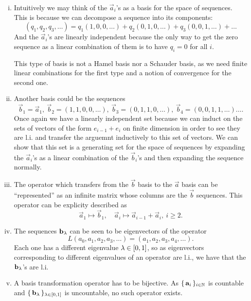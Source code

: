 \documentclass[12pt]{memoir}
\begin{document}
\begin{ptcbr}
    \begin{enumerate}[(i)]
        \item Intuitively we may think of the $\vec a_i$'s as a basis for the space of sequences. This is because we can decompose a sequence into its components:
        $$(q_1,q_2,q_3,\dots)=q_1(1,0,0,\dots)+q_2(0,1,0,\dots)+q_3(0,0,1,\dots)+\dots$$
        And the $\vec a_i$'s are linearly independent because the only way to get the zero sequence as a linear combination of them is to have $q_i=0$ for all $i$.\par 
        This type of basis is not a Hamel basis nor a Schauder basis, as we need finite linear combinations for the first type and a notion of convergence for the second one.
        \item Another basis could be the sequences 
        $$\vec b_1=\vec a_1,\ \vec b_2=(1,1,0,0,\dots),\ \vec b_3=(0,1,1,0,\dots),\ \vec b_4=(0,0,1,1,\dots).\dots$$
        Once again we have a linearly independent set because we can induct on the sets of vectors of the form $e_{i-1}+e_{i}$ on finite dimension in order to see they are l.i. and transfer the arguemnt inductively to this set of vectors. We can show that this set is a generating set for the space of sequences by expanding the $\vec a_i$'s as a linear combination of the $\vec b_i$'s and then expanding the sequence normally. 
        \item The operator which transfers from the $\vec b$ basis to the $\vec a$ basis can be ``represented'' as an infinite matrix whose columns are the $\vec b$ sequences. This operator can be explicity described as 
        $$\vec a_1\mapsto\vec b_1,\quad \vec a_i\mapsto\vec a_{i-1}+\vec a_{i},\ i\geq 2.$$
        \item The sequences $\mathbf{b}_\lambda$ can be seen to be eigenvectors of the operator 
        $$L(a_0,a_1,a_2,a_3,\dots)=(a_1,a_2,a_3,a_4,\dots).$$
        Each one has a different eigenvalue $\lambda\in\left\lbrack0,1\right\rbrack$, so as eigenvectors corresponding to different eigenvalues of an operator are l.i., we have that the $\mathbf{b}_\lambda$'s are l.i.\par 
        \item A basis transformation operator has to be bijective. As $\{\,\mathbf{a}_i\,\}_{i\in\mathbb{N}}$ is countable and $\{\,\mathbf{b}_\lambda\,\}_{\lambda\in\left\lbrack0,1\right\rbrack}$ is uncountable, no such operator exists.
    \end{enumerate}
\end{ptcbr}
\end{document}
